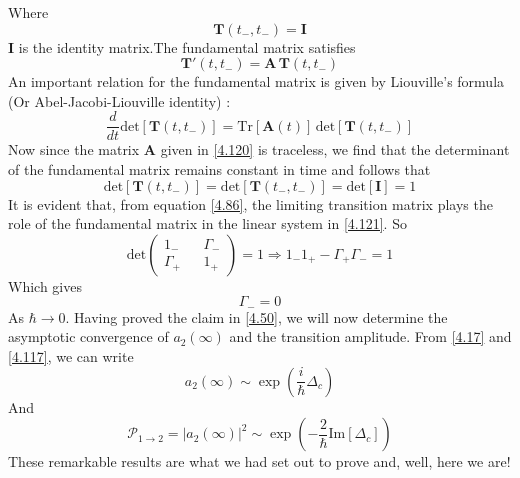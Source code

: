 \documentclass[12pt,a4paper]{article}
\begin{document}
	Where
	\begin{equation}
		\mathbf{T}(t_{-}, t_{-}) = \mathbf{I} \label{4.123}
	\end{equation}
	$\mathbf{I}$ is the identity matrix.The fundamental matrix satisfies
	\begin{equation}
		\mathbf{T}'(t, t_{-}) = \mathbf{A}\, \mathbf{T}(t, t_{-}) \label{4.124}
	\end{equation}
	An important relation for the fundamental matrix is given by Liouville's formula (Or Abel-Jacobi-Liouville identity) \cite{CoddingtonLevinson1955}:
	\begin{equation}
		\frac{d}{dt} \mathrm{det} \left[ \mathbf{T}(t, t_{-}) \right] = \mathrm{Tr} \left[ \mathbf{A}(t) \right]\, \mathrm{det} \left[ \mathbf{T}(t, t_{-}) \right] \label{4.125}
	\end{equation}
	Now since the matrix $\mathbf{A}$ given in \eqref{4.120} is traceless, we find that the determinant of the fundamental matrix remains constant in time and follows that
	\begin{equation}
		\mathrm{det} \left[ \mathbf{T}(t, t_{-}) \right] = \mathrm{det} \left[ \mathbf{T}(t_{-}, t_{-}) \right] = \mathrm{det}[ \mathbf{I}] = 1 \label{4.126}
	\end{equation}
	It is evident that, from equation \eqref{4.86}, the limiting transition matrix plays the role of the fundamental matrix in the linear system in \eqref{4.121}. So
	\begin{equation}
		\mathrm{det}
		\begin{pmatrix}
			1_{-} && \Gamma_{-} \\[5pt]
			\Gamma_{+} && 1_{+}	 
		\end{pmatrix} = 1 \Rightarrow 1_{-} 1_{+} - \Gamma_{+} \Gamma_{-} = 1 \label{4.127}
	\end{equation}
	Which gives
	\begin{equation}
		\Gamma_{-} = 0 \label{4.128}
	\end{equation}
	As $\hbar \rightarrow 0$. Having proved the claim in \eqref{4.50}, we will now determine the asymptotic convergence of $a_{2}(\infty)$ and the transition amplitude. From \eqref{4.17} and \eqref{4.117}, we can write
	\begin{equation}
		\boxed{a_{2}(\infty) \sim \exp\left( \frac{i}{\hbar} \Delta_{c} \right)} \label{4.129}
	\end{equation}
	And
	\begin{equation}
		\boxed{\mathcal{P}_{1\rightarrow2} = \left| a_{2}(\infty) \right|^{2} \sim \exp\left( -\frac{2}{\hbar} \mathrm{Im} \left[ \Delta_{c} \right] \right)} \label{4.130}
	\end{equation}
	These remarkable results are what we had set out to prove and, well, here we are!
	
\end{document}
